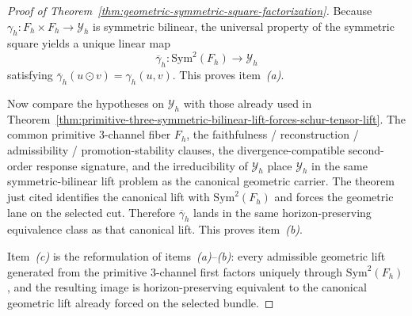 \begin{proof}[Proof of Theorem~\ref{thm:geometric-symmetric-square-factorization}]
\label{proof:thm:geometric-symmetric-square-factorization}
Because \(\gamma_h:F_h\times F_h\to \mathcal Y_h\) is symmetric bilinear, the
universal property of the symmetric square yields a unique linear map
\[
\overline{\gamma}_h:\mathrm{Sym}^2(F_h)\to \mathcal Y_h
\]
satisfying \(\overline{\gamma}_h(u\odot v)=\gamma_h(u,v)\). This proves
item~\emph{(a)}.

Now compare the hypotheses on \(\mathcal Y_h\) with those already used in
Theorem~\ref{thm:primitive-three-symmetric-bilinear-lift-forces-schur-tensor-lift}.
The common primitive \(3\)-channel fiber \(F_h\), the faithfulness /
reconstruction / admissibility / promotion-stability clauses, the
divergence-compatible second-order response signature, and the irreducibility
of \(\mathcal Y_h\) place \(\mathcal Y_h\) in the same symmetric-bilinear lift
problem as the canonical geometric carrier. The theorem just cited identifies
the canonical lift with \(\mathrm{Sym}^2(F_h)\) and forces the geometric lane
on the selected cut. Therefore \(\overline{\gamma}_h\) lands in the same
horizon-preserving equivalence class as that canonical lift. This proves
item~\emph{(b)}.

Item~\emph{(c)} is the reformulation of items~\emph{(a)}--\emph{(b)}: every
admissible geometric lift generated from the primitive \(3\)-channel first
factors uniquely through \(\mathrm{Sym}^2(F_h)\), and the resulting image is
horizon-preserving equivalent to the canonical geometric lift already forced
on the selected bundle.
\end{proof}

